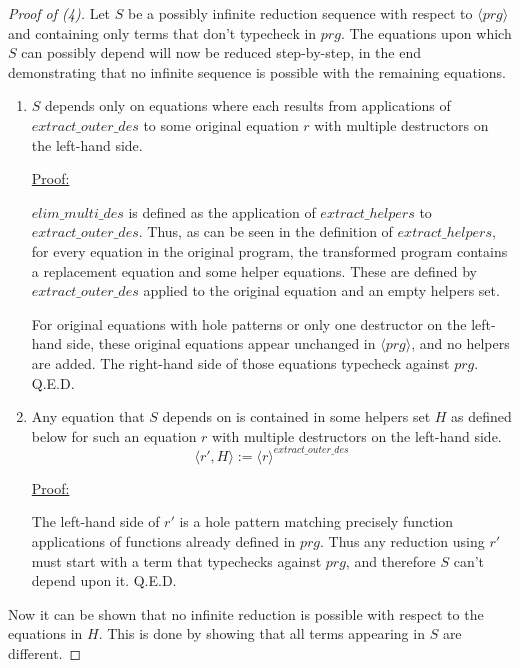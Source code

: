 \documentclass[11pt]{article} %
\begin{document}
\begin{proof}[Proof of (4)]

Let $S$ be a possibly infinite reduction sequence with respect to $\langle prg \rangle$ and containing only terms that don't typecheck in $prg$. The equations upon which $S$ can possibly depend will now be reduced step-by-step, in the end demonstrating that no infinite sequence is possible with the remaining equations.

\begin{enumerate}

\item $S$ depends only on equations where each results from applications of $extract\_outer\_des$ to some original equation $r$ with multiple destructors on the left-hand side.

\underline{Proof:}

$elim\_multi\_des$ is defined as the application of $extract\_helpers$ to $extract\_outer\_des$. Thus, as can be seen in the definition of $extract\_helpers$, for every equation in the original program, the transformed program contains a replacement equation and some helper equations. These are defined by $extract\_outer\_des$ applied to the original equation and an empty helpers set.

For original equations with hole patterns or only one destructor on the left-hand side, these original equations appear unchanged in $\langle prg \rangle$, and no helpers are added. The right-hand side of those equations typecheck against $prg$. Q.E.D.

\item Any equation that $S$ depends on is contained in some helpers set $H$ as defined below for such an equation $r$ with multiple destructors on the left-hand side.
\begin{equation*}
\big\langle r', H \big\rangle := \langle r \rangle^{extract\_outer\_des}
\end{equation*}

\underline{Proof:}

The left-hand side of $r'$ is a hole pattern matching precisely function applications of functions already defined in $prg$. Thus any reduction using $r'$ must start with a term that typechecks against $prg$, and therefore $S$ can't depend upon it. Q.E.D.

\end{enumerate}

Now it can be shown that no infinite reduction is possible with respect to the equations in $H$. This is done by showing that all terms appearing in $S$ are different.


\end{proof}
\end{document}
